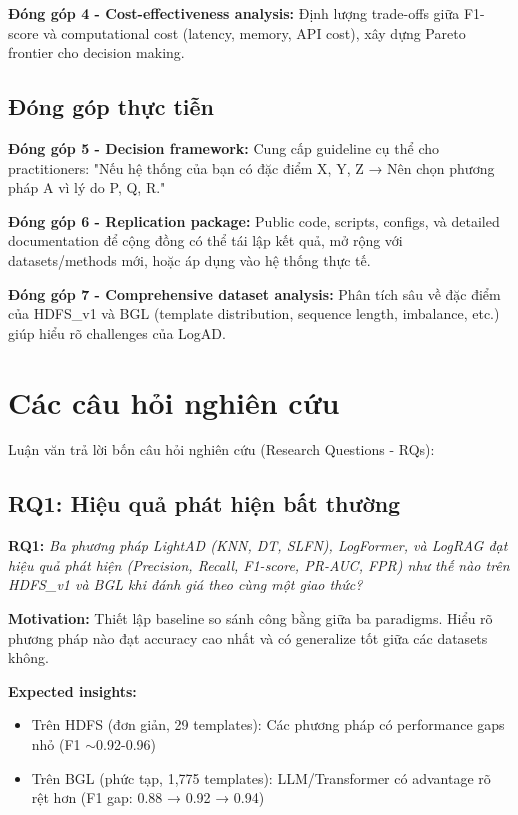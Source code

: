 \textbf{Đóng góp 4 - Cost-effectiveness analysis:} Định lượng trade-offs giữa F1-score và computational cost (latency, memory, API cost), xây dựng Pareto frontier cho decision making.

\subsection{Đóng góp thực tiễn}

\textbf{Đóng góp 5 - Decision framework:} Cung cấp guideline cụ thể cho practitioners: "Nếu hệ thống của bạn có đặc điểm X, Y, Z → Nên chọn phương pháp A vì lý do P, Q, R."

\textbf{Đóng góp 6 - Replication package:} Public code, scripts, configs, và detailed documentation để cộng đồng có thể tái lập kết quả, mở rộng với datasets/methods mới, hoặc áp dụng vào hệ thống thực tế.

\textbf{Đóng góp 7 - Comprehensive dataset analysis:} Phân tích sâu về đặc điểm của HDFS\_v1 và BGL (template distribution, sequence length, imbalance, etc.) giúp hiểu rõ challenges của LogAD.

\section{Các câu hỏi nghiên cứu}
\label{sec:research-questions}

Luận văn trả lời bốn câu hỏi nghiên cứu (Research Questions - RQs):

\subsection{RQ1: Hiệu quả phát hiện bất thường}

\textbf{RQ1:} \textit{Ba phương pháp LightAD (KNN, DT, SLFN), LogFormer, và LogRAG đạt hiệu quả phát hiện (Precision, Recall, F1-score, PR-AUC, FPR) như thế nào trên HDFS\_v1 và BGL khi đánh giá theo cùng một giao thức?}

\textbf{Motivation:} Thiết lập baseline so sánh công bằng giữa ba paradigms. Hiểu rõ phương pháp nào đạt accuracy cao nhất và có generalize tốt giữa các datasets không.

\textbf{Expected insights:}
\begin{itemize}
    \item Trên HDFS (đơn giản, 29 templates): Các phương pháp có performance gaps nhỏ (F1 $\sim$0.92-0.96)
    \item Trên BGL (phức tạp, 1,775 templates): LLM/Transformer có advantage rõ rệt hơn (F1 gap: 0.88 → 0.92 → 0.94)
\end{itemize}

